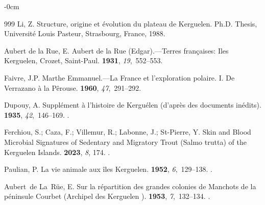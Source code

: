 \documentclass[geomatics,article,accept,pdftex,moreauthors]{Definitions/mdpi}
\begin{document}
\begin{adjustwidth}{-\extralength}{0cm}
\begin{thebibliography}{999}
Li, Z.
\newblock Structure, origine et évolution du plateau de Kerguelen.
\newblock Ph.D. Thesis, Université Louis Pasteur, Strasbourg, France,  1988.

{Aubert de la Rue}, E.
\newblock Aubert de la Rue (Edgar).---Terres françaises: Iles Kerguelen,
  Crozet, Saint-Paul.
 {\bf 1931}, {\em 19},~552--553.

Faivre, J.P.
\newblock Marthe Emmanuel.---La France et l'exploration polaire. I. De
  Verrazano à la Pêrouse.
 {\bf 1960}, {\em 47},~291--292.

Dupouy, A.
\newblock Supplément à l'histoire de Kerguélen (d'après des documents
  inédits).
 {\bf 1935}, {\em
  42},~146--169.
.


Ferchiou, S.; Caza, F.; Villemur, R.; Labonne, J.; St-Pierre, Y.
\newblock Skin and Blood Microbial Signatures of Sedentary and Migratory Trout
  (Salmo trutta) of the Kerguelen Islands.
 {\bf 2023}, {\em 8}, 174. %
.


Paulian, P.
\newblock La vie animale aux îles Kerguelen.
 {\bf 1952}, {\em
  6},~129--138.
.

Aubert~de La~Rüe, E.
\newblock Sur la répartition des grandes colonies de Manchots de la péninsule
  Courbet (Archipel des Kerguelen ).
 {\bf 1953}, {\em
  7},~132--134.
.


\end{thebibliography}
\end{adjustwidth}
\end{document}
